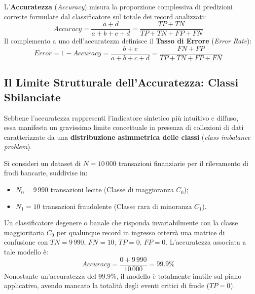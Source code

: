 \begin{definition}
L'\textbf{Accuratezza} (\textit{Accuracy}) misura la proporzione complessiva di predizioni corrette formulate dal classificatore sul totale dei record analizzati:
\begin{equation}
    Accuracy = \frac{a + d}{a + b + c + d} = \frac{TP + TN}{TP + TN + FP + FN}
\end{equation}
Il complemento a uno dell'accuratezza definisce il \textbf{Tasso di Errore} (\textit{Error Rate}):
\begin{equation}
    Error = 1 - Accuracy = \frac{b + c}{a + b + c + d} = \frac{FN + FP}{TP + TN + FP + FN}
\end{equation}
\end{definition}

\FloatBarrier
\subsection{Il Limite Strutturale dell'Accuratezza: Classi Sbilanciate}
\label{subsec:dm-accuracy-imbalance-limit}

Sebbene l'accuratezza rappresenti l'indicatore sintetico più intuitivo e diffuso, essa manifesta un gravissimo limite concettuale in presenza di collezioni di dati caratterizzate da una \textbf{distribuzione asimmetrica delle classi} (\textit{class imbalance problem}).

\begin{example}
Si consideri un dataset di $N = 10\,000$ transazioni finanziarie per il rilevamento di frodi bancarie, suddivise in:
\begin{itemize}
    \item $N_0 = 9\,990$ transazioni lecite (Classe di maggioranza $C_0$);
    \item $N_1 = 10$ transazioni fraudolente (Classe rara di minoranza $C_1$).
\end{itemize}
Un classificatore degenere o banale che risponda invariabilmente con la classe maggioritaria $C_0$ per qualunque record in ingresso otterrà una matrice di confusione con $TN = 9\,990$, $FN = 10$, $TP = 0$, $FP = 0$.
L'accuratezza associata a tale modello è:
\begin{equation}
    Accuracy = \frac{0 + 9\,990}{10\,000} = 99.9\%
\end{equation}
Nonostante un'accuratezza del $99.9\%$, il modello è totalmente inutile sul piano applicativo, avendo mancato la totalità degli eventi critici di frode ($TP = 0$).
\end{example}

